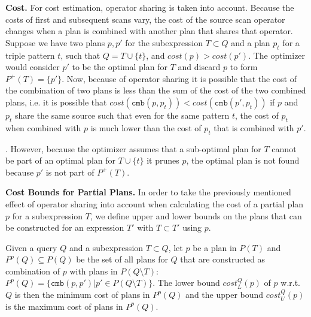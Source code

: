 \textbf{Cost.} For cost estimation, operator sharing is taken into account. Because the costs of first and subsequent scans vary, the cost of the source scan operator changes when a plan is
combined with another plan that shares that operator. 
Suppose we have two plans $p,p'$ for the subexpression $T \subset Q$
and a plan $p_t$ for a triple pattern $t$, such that $Q = T \cup
\{t\}$, and $cost(p) > cost(p')$. The optimizer would consider $p'$
to be the optimal plan for $T$ and discard $p$ to form
$P^+(T)=\{p'\}$. Now, because of operator sharing it is possible that
the cost of the combination of two plans is less than the sum of the
cost of the two combined plans, i.e. it is possible that $cost(\mathtt{cmb}(p,p_t)) < cost(\mathtt{cmb}(p',p_t))$ if 
$p$ and $p_t$ share the same source such that even for the same pattern $t$, the cost of $p_t$ when combined with $p$ is much lower than the cost of $p_t$ that is combined with $p'$. 

. However, because the optimizer assumes that a
sub-optimal plan for $T$ cannot be part of an optimal plan for $T \cup
\{t\}$ it prunes $p$, the optimal plan is not found because $p'$ is
not part of $P^+(T)$.


\textbf{Cost Bounds for Partial Plans.} In order to take the
previously mentioned effect of operator sharing into account when
calculating the cost of a partial plan $p$ for a subexpression $T$, we
define upper and lower bounds on the plans that can be constructed for
an expression $T'$ with $T \subset T'$ using $p$.

\begin{definition}
  \label{def:bounds}
  Given a query $Q$ and a subexpression $T \subset Q$, let $p$ be a
  plan in $P(T)$ and $P^p(Q) \subseteq P(Q)$ be the set of all plans
  for $Q$ that are constructed as combination of $p$ with plans in
  $P(Q \setminus T)$: $P^p(Q) = \{\mathtt{cmb}(p,p') | p' \in P(Q
  \setminus T)\}$.  The lower bound $cost_L^Q(p)$ of $p$ w.r.t. $Q$
  is then the minimum cost of plans in $P^p(Q)$ and the upper bound
  $cost_U^Q(p)$ is the maximum cost of plans in $P^p(Q)$.
\end{definition}

